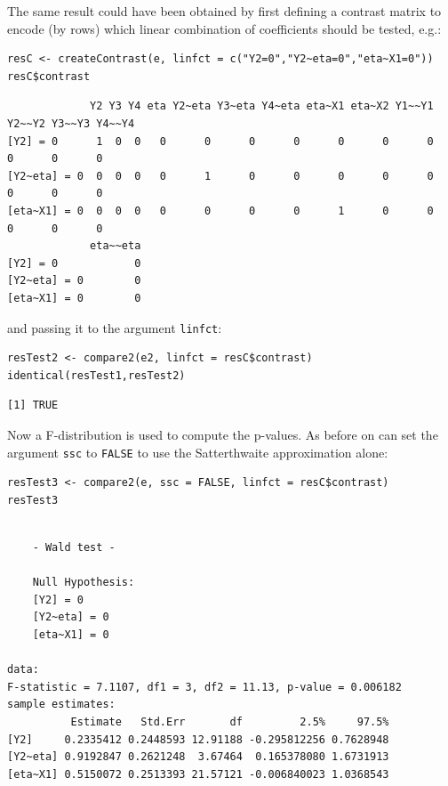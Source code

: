 \documentclass[12pt]{article}
\begin{document}
The same result could have been obtained by first defining a contrast
matrix to encode (by rows) which linear combination of coefficients
should be tested, e.g.:
\lstset{language=r,label= ,caption= ,captionpos=b,numbers=none}
\begin{lstlisting}
resC <- createContrast(e, linfct = c("Y2=0","Y2~eta=0","eta~X1=0"))
resC$contrast
\end{lstlisting}

\begin{verbatim}
             Y2 Y3 Y4 eta Y2~eta Y3~eta Y4~eta eta~X1 eta~X2 Y1~~Y1 Y2~~Y2 Y3~~Y3 Y4~~Y4
[Y2] = 0      1  0  0   0      0      0      0      0      0      0      0      0      0
[Y2~eta] = 0  0  0  0   0      1      0      0      0      0      0      0      0      0
[eta~X1] = 0  0  0  0   0      0      0      0      1      0      0      0      0      0
             eta~~eta
[Y2] = 0            0
[Y2~eta] = 0        0
[eta~X1] = 0        0
\end{verbatim}


and passing it to the argument \texttt{linfct}:
\lstset{language=r,label= ,caption= ,captionpos=b,numbers=none}
\begin{lstlisting}
resTest2 <- compare2(e2, linfct = resC$contrast)
identical(resTest1,resTest2)
\end{lstlisting}

\begin{verbatim}
[1] TRUE
\end{verbatim}


Now a F-distribution is used to compute the p-values. As before on can
set the argument \texttt{ssc} to \texttt{FALSE} to use the Satterthwaite
approximation alone:
\lstset{language=r,label= ,caption= ,captionpos=b,numbers=none}
\begin{lstlisting}
resTest3 <- compare2(e, ssc = FALSE, linfct = resC$contrast)
resTest3
\end{lstlisting}

\begin{verbatim}

	- Wald test -

	Null Hypothesis:
	[Y2] = 0
	[Y2~eta] = 0
	[eta~X1] = 0

data:  
F-statistic = 7.1107, df1 = 3, df2 = 11.13, p-value = 0.006182
sample estimates:
          Estimate   Std.Err       df         2.5%     97.5%
[Y2]     0.2335412 0.2448593 12.91188 -0.295812256 0.7628948
[Y2~eta] 0.9192847 0.2621248  3.67464  0.165378080 1.6731913
[eta~X1] 0.5150072 0.2513393 21.57121 -0.006840023 1.0368543
\end{verbatim}
\end{document}
